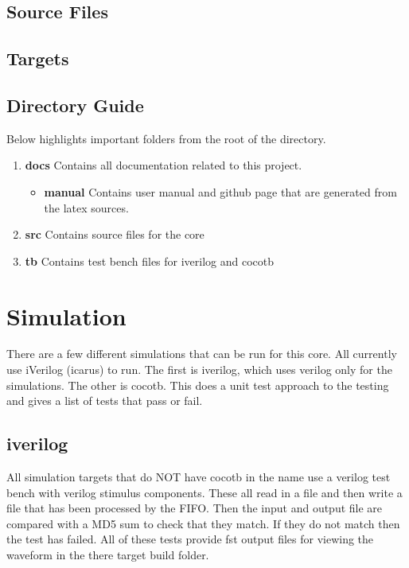 \subsection{Source Files}



\subsection{Targets}



\subsection{Directory Guide}

\par
Below highlights important folders from the root of the directory.

\begin{enumerate}
  \item \textbf{docs} Contains all documentation related to this project.
    \begin{itemize}
      \item \textbf{manual} Contains user manual and github page that are generated from the latex sources.
    \end{itemize}
  \item \textbf{src} Contains source files for the core
  \item \textbf{tb} Contains test bench files for iverilog and cocotb
\end{enumerate}

\newpage

\section{Simulation}
\par
There are a few different simulations that can be run for this core. All currently use iVerilog (icarus) to run. The first is iverilog, which
uses verilog only for the simulations. The other is cocotb. This does a unit test approach to the testing and gives a list of tests that pass
or fail.

\subsection{iverilog}
\par
All simulation targets that do NOT have cocotb in the name use a verilog test bench with verilog stimulus components. These all read in a file
and then write a file that has been processed by the FIFO. Then the input and output file are compared with a MD5 sum to check that they
match. If they do not match then the test has failed. All of these tests provide fst output files for viewing the waveform in the there
target build folder.

